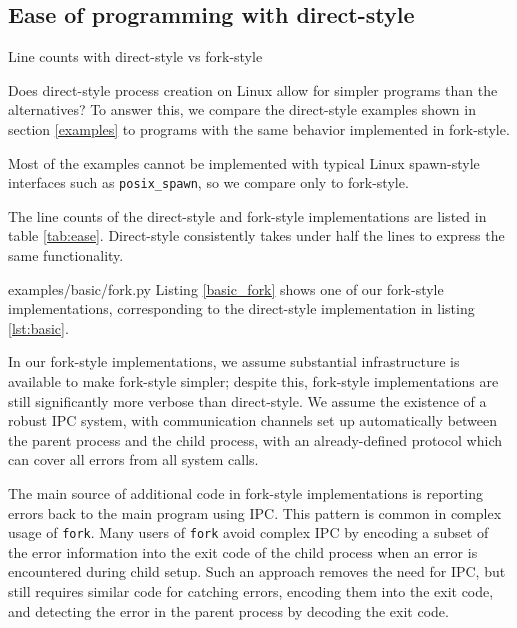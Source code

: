 \documentclass[letterpaper,twocolumn,10pt]{article}
\begin{document}
\subsection{Ease of programming with direct-style}\label{ease}
\begin{table}

\caption{Line counts with direct-style vs fork-style}
\label{tab:ease}
\end{table}
Does direct-style process creation on Linux allow for simpler programs than the alternatives?
To answer this, we compare the direct-style examples shown in section \ref{examples}
to programs with the same behavior implemented in fork-style.

Most of the examples cannot be implemented with typical Linux spawn-style interfaces such as \verb|posix_spawn|,
so we compare only to fork-style.

The line counts of the direct-style and fork-style implementations are listed in table \ref{tab:ease}.
Direct-style consistently takes under half the lines to express the same functionality.


{examples/basic/fork.py}
Listing \ref{basic_fork} shows one of our fork-style implementations,
corresponding to the direct-style implementation in listing \ref{lst:basic}.

In our fork-style implementations,
we assume substantial infrastructure is available to make fork-style simpler;
despite this, fork-style implementations are still significantly more verbose than direct-style.
We assume the existence of a robust IPC system,
with communication channels set up automatically between the parent process and the child process,
with an already-defined protocol which can cover all errors from all system calls.

The main source of additional code in fork-style implementations
is reporting errors back to the main program using IPC.
This pattern is common in complex usage of \texttt{fork}\cite{posix_spawn_error_pipe}\cite{python_subprocess_errpipe}.
Many users of \texttt{fork} avoid complex IPC
by encoding a subset of the error information into the exit code of the child process
when an error is encountered during child setup.
Such an approach removes the need for IPC,
but still requires similar code for catching errors, encoding them into the exit code,
and detecting the error in the parent process by decoding the exit code.
\end{document}
